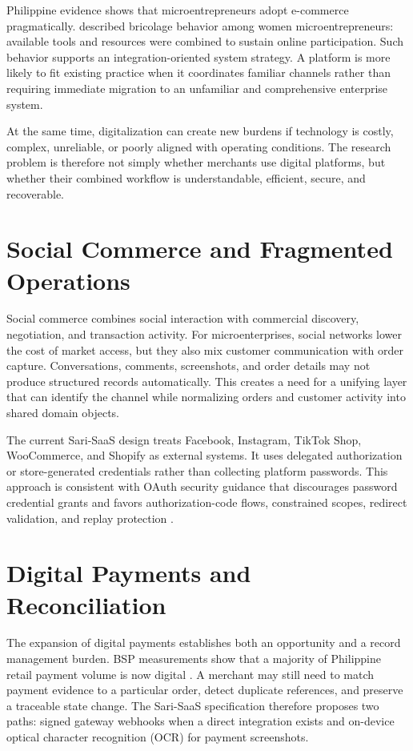 \documentclass[12pt,oneside]{report}
\begin{document}
Philippine evidence shows that microentrepreneurs adopt e-commerce pragmatically.
\textcite{romero2023women} described bricolage behavior among women
microentrepreneurs: available tools and resources were combined to sustain
online participation. Such behavior supports an integration-oriented system
strategy. A platform is more likely to fit existing practice when it coordinates
familiar channels rather than requiring immediate migration to an unfamiliar
and comprehensive enterprise system.

At the same time, digitalization can create new burdens if technology is costly,
complex, unreliable, or poorly aligned with operating conditions. The research
problem is therefore not simply whether merchants use digital platforms, but
whether their combined workflow is understandable, efficient, secure, and
recoverable.

\section{Social Commerce and Fragmented Operations}
Social commerce combines social interaction with commercial discovery,
negotiation, and transaction activity. For microenterprises, social networks
lower the cost of market access, but they also mix customer communication with
order capture. Conversations, comments, screenshots, and order details may not
produce structured records automatically. This creates a need for a unifying
layer that can identify the channel while normalizing orders and customer
activity into shared domain objects.

The current Sari-SaaS design treats Facebook, Instagram, TikTok Shop,
WooCommerce, and Shopify as external systems. It uses delegated authorization
or store-generated credentials rather than collecting platform passwords. This
approach is consistent with OAuth security guidance that discourages password
credential grants and favors authorization-code flows, constrained scopes,
redirect validation, and replay protection \parencite{rfc9700oauth}.

\section{Digital Payments and Reconciliation}
The expansion of digital payments establishes both an opportunity and a record
management burden. BSP measurements show that a majority of Philippine retail
payment volume is now digital \parencite{bsp2024payments}. A merchant may still
need to match payment evidence to a particular order, detect duplicate
references, and preserve a traceable state change. The Sari-SaaS specification
therefore proposes two paths: signed gateway webhooks when a direct integration
exists and on-device optical character recognition (OCR) for payment
screenshots.
\end{document}

